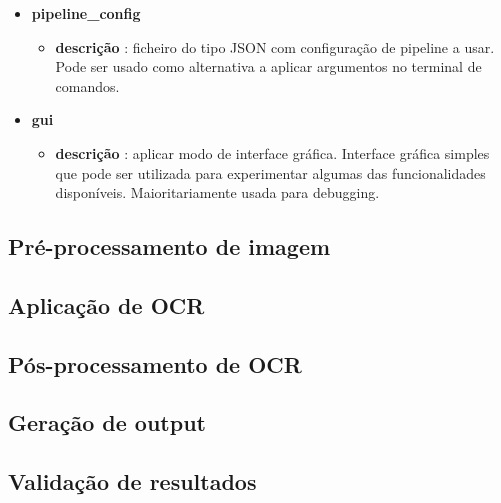\begin{itemize}
	\item \textbf{pipeline\_config}
		\begin{itemize}\setlength\itemsep{-0.5em}
			\item \textbf{descrição} : ficheiro do tipo JSON com configuração de pipeline a usar. Pode ser usado como alternativa a aplicar argumentos no terminal de comandos.
		\end{itemize}
		
	\item \textbf{gui}
		\begin{itemize}\setlength\itemsep{-0.5em}
			\item \textbf{descrição} : aplicar modo de interface gráfica. Interface gráfica simples que pode ser utilizada para experimentar algumas das funcionalidades disponíveis. Maioritariamente usada para debugging.
		\end{itemize}
\end{itemize}


\subsection{Pré-processamento de imagem}



\subsection{Aplicação de OCR}


\subsection{Pós-processamento de OCR}


\subsection{Geração de output}


\subsection{Validação de resultados}


